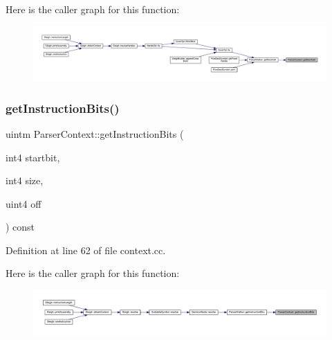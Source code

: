 Here is the caller graph for this function\+:
\nopagebreak
\begin{figure}[H]
\begin{center}
\leavevmode
\includegraphics[width=350pt]{class_parser_context_a85ee6aa4678230479716fbecb6be31cf_icgraph}
\end{center}
\end{figure}
\mbox{\label{class_parser_context_abe5d087584325bdb7f435bc2b15da64c}} 
\subsubsection{\texorpdfstring{getInstructionBits()}{getInstructionBits()}}
{\footnotesize\ttfamily uintm Parser\+Context\+::get\+Instruction\+Bits (\begin{DoxyParamCaption}\item[{int4}]{startbit,  }\item[{int4}]{size,  }\item[{uint4}]{off }\end{DoxyParamCaption}) const}



Definition at line 62 of file context.\+cc.

Here is the caller graph for this function\+:
\nopagebreak
\begin{figure}[H]
\begin{center}
\leavevmode
\includegraphics[width=350pt]{class_parser_context_abe5d087584325bdb7f435bc2b15da64c_icgraph}
\end{center}
\end{figure}
\mbox{\label{class_parser_context_a5112f754f6655d02c1515a6667e9328e}} 
